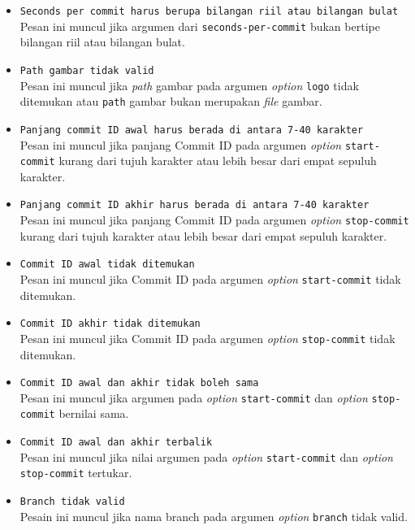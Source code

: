 \begin{itemize}
\item \texttt{Seconds per commit harus berupa bilangan riil atau bilangan bulat}\\
Pesan ini muncul jika argumen dari \texttt{seconds-per-commit} bukan bertipe bilangan riil atau bilangan bulat. 
\item \texttt{Path gambar tidak valid}\\
Pesan ini muncul jika \textit{path} gambar pada argumen \textit{option} \texttt{logo} tidak ditemukan atau \texttt{path} gambar bukan merupakan \textit{file} gambar.
\item \texttt{Panjang commit ID awal harus berada di antara 7-40 karakter}\\
Pesan ini muncul jika panjang Commit ID pada argumen \textit{option} \texttt{start-commit} kurang dari tujuh karakter atau lebih besar dari empat sepuluh karakter.
\item \texttt{Panjang commit ID akhir harus berada di antara 7-40 karakter}\\
Pesan ini muncul jika panjang Commit ID pada argumen \textit{option} \texttt{stop-commit} kurang dari tujuh karakter atau lebih besar dari empat sepuluh karakter.
\item \texttt{Commit ID awal tidak ditemukan}\\
Pesan ini muncul jika Commit ID pada argumen \textit{option} \texttt{start-commit} tidak ditemukan.
\item \texttt{Commit ID akhir tidak ditemukan}\\
Pesan ini muncul jika Commit ID pada argumen \textit{option} \texttt{stop-commit} tidak ditemukan.
\item \texttt{Commit ID awal dan akhir tidak boleh sama}\\
Pesan ini muncul jika argumen pada \textit{option} \texttt{start-commit} dan \textit{option} \texttt{stop-commit} bernilai sama.
\item \texttt{Commit ID awal dan akhir terbalik}\\
Pesan ini muncul jika nilai argumen pada \textit{option} \texttt{start-commit} dan \textit{option} \texttt{stop-commit} tertukar.
\item \texttt{Branch tidak valid}\\
Pesain ini muncul jika nama branch pada argumen \textit{option} \texttt{branch} tidak valid.
\end{itemize}

